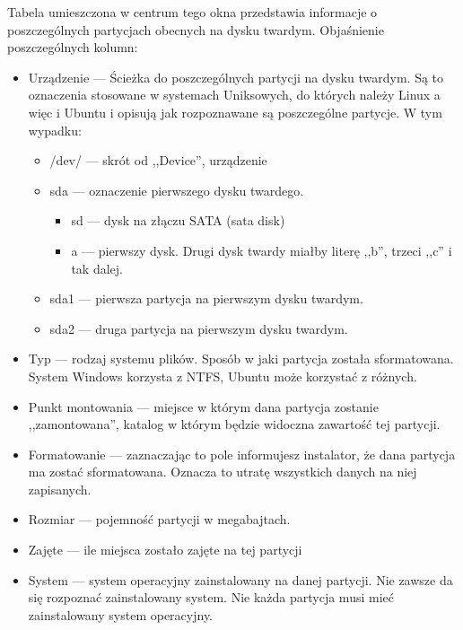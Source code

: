 Tabela umieszczona w centrum tego okna przedstawia informacje o poszczególnych partycjach obecnych na dysku twardym. Objaśnienie poszczególnych kolumn:
\begin{itemize}
\item \textcolor{ubuntu_orange}{Urządzenie} --- Ścieżka do poszczególnych partycji na dysku twardym. Są to oznaczenia stosowane w systemach Uniksowych, do których należy Linux a więc i Ubuntu i opisują jak rozpoznawane są poszczególne partycje. W tym wypadku:
        \begin{itemize}
        \item \textcolor{ubuntu_orange}{/dev/} --- skrót od ,,Device'', urządzenie
        \item \textcolor{ubuntu_orange}{sda} --- oznaczenie pierwszego dysku twardego.
                \begin{itemize}
                        \item \textcolor{ubuntu_orange}{sd} --- dysk na złączu SATA (sata disk)
                        \item \textcolor{ubuntu_orange}{a} --- pierwszy dysk. Drugi dysk twardy miałby literę ,,b'', trzeci ,,c'' i tak dalej.
                \end{itemize}
        \item \textcolor{ubuntu_orange}{sda1} --- pierwsza partycja na pierwszym dysku twardym.
        \item \textcolor{ubuntu_orange}{sda2} --- druga partycja na pierwszym dysku twardym.
        \end{itemize}
\item \textcolor{ubuntu_orange}{Typ} --- rodzaj systemu plików. Sposób w jaki partycja została sformatowana. System Windows korzysta z NTFS, Ubuntu może korzystać z różnych.
\item \textcolor{ubuntu_orange}{Punkt montowania} --- miejsce w którym dana partycja zostanie ,,zamontowana'', katalog w którym będzie widoczna zawartość tej partycji.
\item \textcolor{ubuntu_orange}{Formatowanie} --- zaznaczając to pole informujesz instalator, że dana partycja ma zostać sformatowana. Oznacza to utratę wszystkich danych na niej zapisanych.
\item \textcolor{ubuntu_orange}{Rozmiar} --- pojemność partycji w megabajtach.
\item \textcolor{ubuntu_orange}{Zajęte} --- ile miejsca zostało zajęte na tej partycji
\item \textcolor{ubuntu_orange}{System} --- system operacyjny zainstalowany na danej partycji. Nie zawsze da się rozpoznać zainstalowany system. Nie każda partycja musi mieć zainstalowany system operacyjny. 
\end{itemize}
\clearpage
